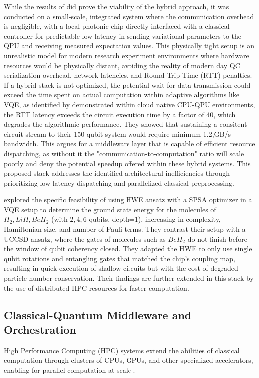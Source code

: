 While the results of \textcite{peruzzo2014variational} did prove the viability of the hybrid approach, it was conducted on a small-scale, 
integrated system where the communication overhead is negligible, with a local photonic chip directly interfaced with a classical controller 
for predictable low-latency in sending variational parameters to the QPU and receiving measured expectation values. 
This physically tight setup is an unrealistic model for modern research experiment environments where hardware resources would be physically distant, avoiding the reality of 
modern day QC serialization overhead, network latencies, and Round-Trip-Time (RTT) penalties. 
If a hybrid stack is not optimized, the potential wait for data transmission could exceed the time spent on actual computation within adaptive algorithms like VQE, as identified by \textcite{cruise2020practicalquantumcomputingvalue}
demonstrated within cloud native CPU-QPU environments, the RTT latency exceeds the circuit execution time by a factor of 40, which degrades the algorithmic performance. They showed 
that sustaining a consitent circuit stream to their 150-qubit system would require minimum 1.2,GB/s bandwidth. This argues for a middleware layer that is
capable of efficient resource dispatching,  as without it the "communication-to-computation" ratio will scale poorly and deny the potential 
speedup offered within these hybrid systems. This proposed stack addresses the identified architectural inefficiencies 
through prioritizing low-latency dispatching and parallelized classical preprocessing. 

\textcite{kandala2017hardware} explored the specific feasibility of using HWE ansatz with a SPSA optimizer 
in a VQE setup to determine the ground state energy for the molecules of $H_2, LiH, BeH_{2}$ (with $2,4,6$ qubits, depth=1), increasing in complexity, Hamiltonian size, and number of Pauli terms. 
They contrast their setup with a UCCSD ansatz, where the gates of molecules such as $BeH_{2}$ do not finish before the window of qubit coherency closed. 
They adapted the HWE to only use single qubit rotations and entangling gates that matched the chip's coupling map, resulting in quick execution of shallow circuits but with the cost of degraded particle number conservation.  
Their findings are further extended in this stack by the use of distributed HPC resources for faster computation. 

\subsection{Classical-Quantum Middleware and Orchestration}
High Performance Computing (HPC) systems extend the abilities of classical computation through clusters of CPUs, GPUs, and 
other specialized accelerators, enabling for parallel computation at scale \parencite{rallis2025interfacingquantumcomputingsystems}. 


